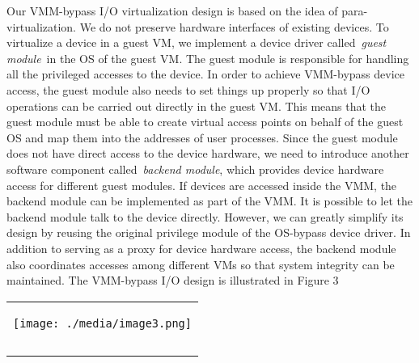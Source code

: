 \documentclass[12pt]{article}
\begin{document}
{\fontsize{13pt}{15.6pt}\selectfont Our VMM-bypass I/O virtualization design is based on the idea of para-virtualization. We do not preserve hardware interfaces of existing devices. To virtualize a device in a guest VM, we implement a device driver called \textit{guest module} in the OS of the guest VM. The guest module is responsible for handling all the privileged accesses to the device. In order to achieve VMM-bypass device access, the guest module also needs to set things up properly so that I/O operations can be carried out directly in the guest VM. This means that the guest module must be able to create virtual access points on behalf of the guest OS and map them into the addresses of user processes. Since the guest module does not have direct access to the device hardware, we need to introduce another software component called \textit{backend module}, which provides device hardware access for different guest modules. If devices are accessed inside the VMM, the backend module can be implemented as part of the VMM. It is possible to let the backend module talk to the device directly. However, we can greatly simplify its design by reusing the original privilege module of the OS-bypass device driver. In addition to serving as a proxy for device hardware access, the backend module also coordinates accesses among different VMs so that system integrity can be maintained. The VMM-bypass I/O design is illustrated in Figure 3\par}\par





\begin{table}[H]
 			\centering
\begin{tabular}{p{4.75in}}
\multicolumn{1}{p{4.75in}}{
	\begin{Center}
		\texttt{[image: ./media/image3.png]}
	\end{Center}
} \\
\hhline{~}
\multicolumn{1}{p{4.75in}}{\Centering \textbf{Figure 3:} VM-Bypass I/O (I/O Handled by VMM Directly)} \\
\hhline{~}

\end{tabular}
 \end{table}




\vspace{\baselineskip}
\setlength{\parskip}{0.0pt}
\setlength{\parskip}{8.04pt}
\end{document}
